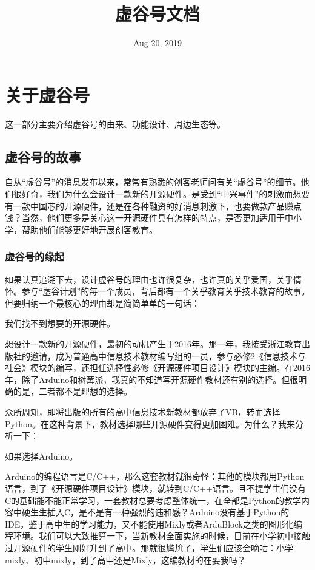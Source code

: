 \documentclass[letterpaper,10pt,english]{sphinxmanual}
\title{虚谷号文档}
\date{Aug 20, 2019}
\author{}
\begin{document}
\maketitle
\sphinxtableofcontents
{}\label{\detokenize{contents::doc}}



\chapter{关于虚谷号}
\label{\detokenize{01.about/index::doc}}\label{\detokenize{01.about/index:id1}}
这一部分主要介绍虚谷号的由来、功能设计、周边生态等。


\section{虚谷号的故事}
\label{\detokenize{01.about/1.1-story:id1}}\label{\detokenize{01.about/1.1-story::doc}}
自从“虚谷号”的消息发布以来，常常有熟悉的创客老师问有关“虚谷号”的细节。他们很好奇，我们为什么会设计一款新的开源硬件。是受到“中兴事件”的刺激而想要有一款中国芯的开源硬件，还是在各种融资的好消息刺激下，也要做款产品赚点钱？当然，他们更多是关心这一开源硬件具有怎样的特点，是否更加适用于中小学，帮助他们能够更好地开展创客教育。


\subsection{虚谷号的缘起}
\label{\detokenize{01.about/1.1-story:id2}}
如果认真追溯下去，设计虚谷号的理由也许很复杂，也许真的关乎爱国，关乎情怀。参与“虚谷计划”的每一个成员，背后都有一个关乎教育关乎技术教育的故事。但要归纳一个最核心的理由却是简简单单的一句话：

我们找不到想要的开源硬件。

想设计一款新的开源硬件，最初的动机产生于2016年。那一年，我接受浙江教育出版社的邀请，成为普通高中信息技术教材编写组的一员，参与必修2《信息技术与社会》模块的编写，还担任选择性必修《开源硬件项目设计》模块的主编。在2016年，除了Arduino和树莓派，我真的不知道写开源硬件教材还有别的选择。但很明确的是，二者都不是理想的选择。

众所周知，即将出版的所有的高中信息技术新教材都放弃了VB，转而选择Python。在这种背景下，教材选择哪些开源硬件变得更加困难。为什么？我来分析一下：

如果选择Arduino。

Arduino的编程语言是C/C++，那么这套教材就很奇怪：其他的模块都用Python语言，到了《开源硬件项目设计》模块，就转到C/C++语言。且不提学生们没有C的基础能不能正常学习，一套教材总要考虑整体统一，在全部是Python的教学内容中硬生生插入C，是不是有一种强烈的违和感？Arduino没有基于Python的IDE，鉴于高中生的学习能力，又不能使用Mixly或者ArduBlock之类的图形化编程环境。我们可以大致推算一下，当新教材全面实施的时候，目前在小学初中接触过开源硬件的学生刚好升到了高中。那就很尴尬了，学生们应该会嘀咕：小学mixly、初中mixly，到了高中还是Mixly，这编教材的在耍我吗？
\end{document}
